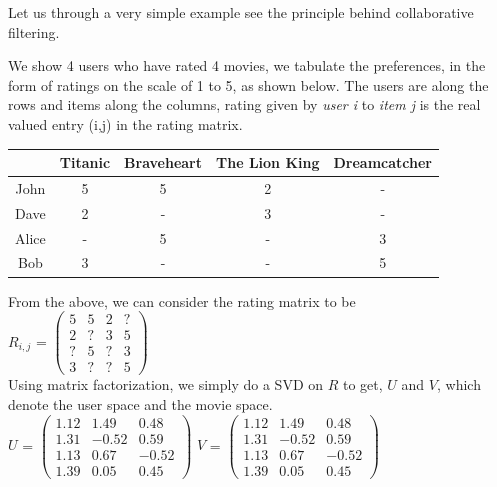 Let us through a very simple example see the principle behind collaborative
filtering.

 \begin{example}
   We show 4 users who have rated 4 movies, we tabulate the preferences, in the
form of ratings on the scale of 1 to 5,  as shown below. The users are along the
rows and items along the columns, rating  given by \textit{user i} to
\textit{item j} is the real valued entry (i,j) in  the rating matrix.  \\

\begin{tabular}{c|cccc}
       & Titanic & Braveheart & The Lion King & Dreamcatcher  \\
\hline
John   & 5 & 5 & 2 & -   \\
Dave   & 2 & - & 3 & -   \\
Alice  & - & 5 & - & 3   \\
Bob    & 3 & - & - & 5   \\
\end{tabular}

From the above, we can consider the rating matrix to be \\

$R_{i,j}$ =
$ \begin{pmatrix}
  5 & 5 & 2 & ? \\
  2 & ? & 3 & 5 \\
  ? & 5 & ? & 3  \\
  3 & ? & ? & 5
 \end{pmatrix} $\\
 
 Using matrix factorization, we simply do a SVD on $R$ to get, $U$ and $V$,
which denote the user space and the movie space. \\
 
 $U$ =
 $\begin{pmatrix}
  1.12 & 1.49 & 0.48  \\
  1.31 & -0.52 & 0.59  \\
  1.13 & 0.67 & -0.52  \\
  1.39 & 0.05 & 0.45 
 \end{pmatrix} $
 \hspace*{10mm}
 $V$ =
 $\begin{pmatrix}
  1.12 & 1.49 & 0.48  \\
  1.31 & -0.52 & 0.59  \\
  1.13 & 0.67 & -0.52  \\
  1.39 & 0.05 & 0.45 
 \end{pmatrix} $\\


\end{example}
